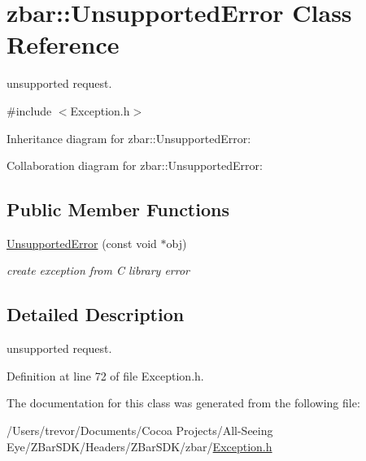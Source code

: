 \hypertarget{classzbar_1_1_unsupported_error}{
\section{zbar::UnsupportedError Class Reference}
\label{classzbar_1_1_unsupported_error}
}


unsupported request.  




{\ttfamily \#include $<$Exception.h$>$}



Inheritance diagram for zbar::UnsupportedError:


Collaboration diagram for zbar::UnsupportedError:
\subsection*{Public Member Functions}
\begin{DoxyCompactItemize}
\item 
\hypertarget{classzbar_1_1_unsupported_error_aaf4be68da3cbd5c0a39d1190be67b877}{
\hyperlink{classzbar_1_1_unsupported_error_aaf4be68da3cbd5c0a39d1190be67b877}{UnsupportedError} (const void $\ast$obj)}
\label{classzbar_1_1_unsupported_error_aaf4be68da3cbd5c0a39d1190be67b877}

\begin{DoxyCompactList}\small\item\em create exception from C library error \end{DoxyCompactList}\end{DoxyCompactItemize}


\subsection{Detailed Description}
unsupported request. 

Definition at line 72 of file Exception.h.



The documentation for this class was generated from the following file:\begin{DoxyCompactItemize}
\item 
/Users/trevor/Documents/Cocoa Projects/All-\/Seeing Eye/ZBarSDK/Headers/ZBarSDK/zbar/\hyperlink{_exception_8h}{Exception.h}\end{DoxyCompactItemize}
